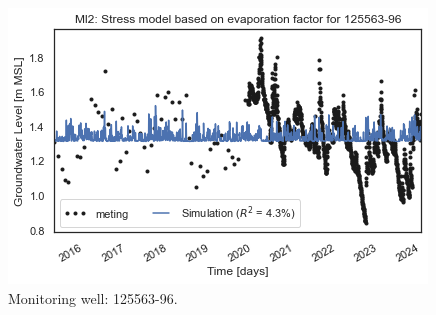 \begin{figure}[htbp]
\begin{minipage}{0.32\textwidth}
        \includegraphics[width=\linewidth]{frontmatter/Heijplaat-fig/12556396.png}
        \caption{Monitoring well: 125563-96.}
        \label{SM: 125563-113}
    \end{minipage}
\end{figure}

